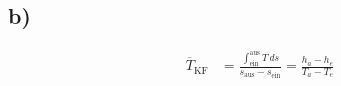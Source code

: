 

\subsection*{b)}
\begin{align*}
\overline{T}_{\text{KF}} &= \frac{\int_{\text{ein}}^{\text{aus}} T \, ds}{s_{\text{aus}} - s_{\text{ein}}} = \frac{h_a - h_e}{T_a - T_e}
\end{align*}